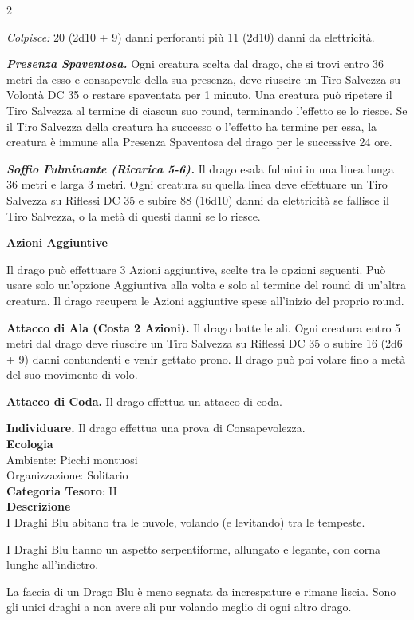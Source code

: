 \begin{multicols}{2}
{\emph{Colpisce:} 20 (2d10 + 9) danni perforanti più 11 (2d10) danni da elettricità.

\emph{\textbf{Presenza Spaventosa.}} Ogni creatura scelta dal drago, che si trovi entro 36 metri da esso e consapevole della sua presenza, deve riuscire un Tiro Salvezza su Volontà DC 35 o restare spaventata per 1 minuto. Una creatura può ripetere il Tiro Salvezza al termine di ciascun suo round, terminando l'effetto se lo riesce. Se il Tiro Salvezza della creatura ha successo o l'effetto ha termine per essa, la creatura è immune alla Presenza Spaventosa del drago per le successive 24 ore.

\emph{\textbf{Soffio Fulminante (Ricarica 5-6).}} Il drago esala fulmini in una linea lunga 36 metri e larga 3 metri. Ogni creatura su quella linea deve effettuare un Tiro Salvezza su Riflessi DC 35 e subire 88 (16d10) danni da elettricità se fallisce il Tiro Salvezza, o la metà di questi danni se lo riesce.

\textbf{Azioni Aggiuntive}

Il drago può effettuare 3 Azioni aggiuntive, scelte tra le opzioni seguenti. Può usare solo un'opzione Aggiuntiva alla volta e solo al termine del round di un'altra creatura. Il drago recupera le Azioni aggiuntive spese all'inizio del proprio round.

\textbf{Attacco di Ala (Costa 2 Azioni).} Il drago batte le ali. Ogni creatura entro 5 metri dal drago deve riuscire un Tiro Salvezza su Riflessi DC 35 o subire 16 (2d6 + 9) danni contundenti e venir gettato prono. Il drago può poi volare fino a metà del suo movimento di volo.

\textbf{Attacco di Coda.} Il drago effettua un attacco di coda.

\textbf{Individuare.} Il drago effettua una prova di Consapevolezza.\\
\textbf{Ecologia}\\
Ambiente: Picchi montuosi\\
Organizzazione: Solitario\\
\textbf{Categoria Tesoro}: H\\
\textbf{Descrizione}\\
I Draghi Blu abitano tra le nuvole, volando (e levitando) tra le tempeste.

I Draghi Blu hanno un aspetto serpentiforme, allungato e legante, con corna lunghe all'indietro.

La faccia di un Drago Blu è meno segnata da increspature e rimane liscia.
Sono gli unici draghi a non avere ali pur volando meglio di ogni altro drago.

}
\end{multicols}

